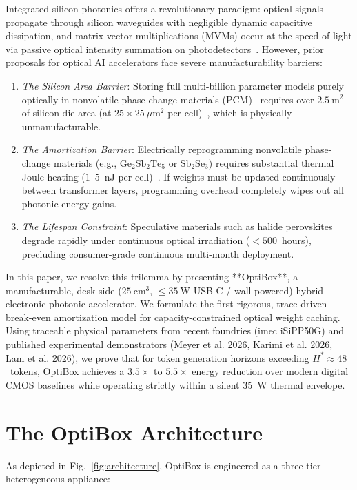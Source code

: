 \documentclass[conference]{IEEEtran}
\begin{document}
Integrated silicon photonics offers a revolutionary paradigm: optical signals propagate through silicon waveguides with negligible dynamic capacitive dissipation, and matrix-vector multiplications (MVMs) occur at the speed of light via passive optical intensity summation on photodetectors~\cite{Shen2017,Feldmann2021,Lin2024}. However, prior proposals for optical AI accelerators face severe manufacturability barriers:
\begin{enumerate}
\item \emph{The Silicon Area Barrier}: Storing full multi-billion parameter models purely optically in nonvolatile phase-change materials (PCM)~\cite{Zhou2023,Feldmann2019} requires over $2.5~\text{m}^2$ of silicon die area (at $25\times25~\mu\text{m}^2$ per cell)~\cite{Karimi2026}, which is physically unmanufacturable.
\item \emph{The Amortization Barrier}: Electrically reprogramming nonvolatile phase-change materials (e.g., $\text{Ge}_2\text{Sb}_2\text{Te}_5$ or $\text{Sb}_2\text{Se}_3$) requires substantial thermal Joule heating ($1\text{--}5$~nJ per cell)~\cite{Fang2022,Meng2023}. If weights must be updated continuously between transformer layers, programming overhead completely wipes out all photonic energy gains.
\item \emph{The Lifespan Constraint}: Speculative materials such as halide perovskites degrade rapidly under continuous optical irradiation ($<500$~hours), precluding consumer-grade continuous multi-month deployment.
\end{enumerate}

In this paper, we resolve this trilemma by presenting **OptiBox**, a manufacturable, desk-side ($25~\text{cm}^3$, $\le 35~\text{W}$ USB-C / wall-powered) hybrid electronic-photonic accelerator. We formulate the first rigorous, trace-driven break-even amortization model for capacity-constrained optical weight caching. Using traceable physical parameters from recent foundries (imec iSiPP50G) and published experimental demonstrators (Meyer et al. 2026, Karimi et al. 2026, Lam et al. 2026), we prove that for token generation horizons exceeding $H^* \approx 48$~tokens, OptiBox achieves a $3.5\times$ to $5.5\times$ energy reduction over modern digital CMOS baselines while operating strictly within a silent 35~W thermal envelope.

\section{The OptiBox Architecture}
As depicted in Fig.~\ref{fig:architecture}, OptiBox is engineered as a three-tier heterogeneous appliance:
\end{document}
